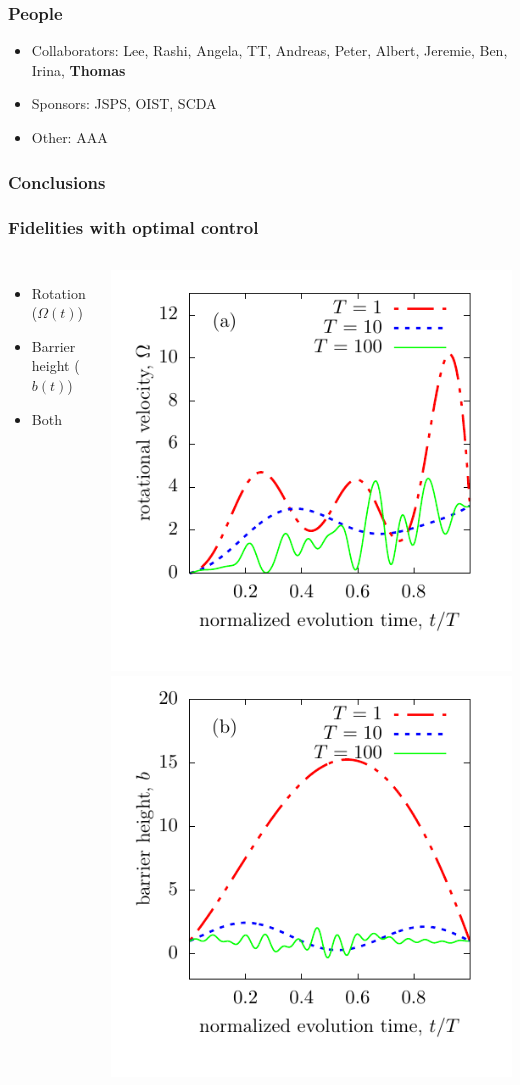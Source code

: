 \documentclass{beamer}
\begin{document}
\begin{frame}
\frametitle{People}
\begin{itemize}
\item Collaborators: Lee, Rashi, Angela, TT, Andreas, Peter, Albert, Jeremie, Ben, Irina, \textbf{Thomas}
\item Sponsors: JSPS, OIST, SCDA
\item Other: AAA
\end{itemize}
\end{frame}

\begin{frame}
\frametitle{Conclusions}
\end{frame}

\begin{frame}
\frametitle{Fidelities with optimal control}
\begin{columns}
\begin{itemize}
\item Rotation ($\Omega(t)$)
\item Barrier height ($b(t)$)
\item Both
\end{itemize}
\includegraphics[width=.49\textwidth]{../data/1d/figR0.pdf}
\includegraphics[width=.49\textwidth]{../data/1d/figB0.pdf}


\end{columns}
\end{frame}
\end{document}
